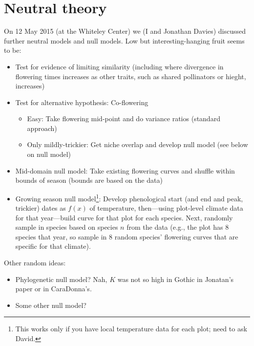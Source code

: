 \documentclass[11pt,a4paper]{article}
\begin{document}
\section{Neutral theory}
On 12 May 2015 (at the Whiteley Center) we (I and Jonathan Davies) discussed further neutral models and null models. Low but interesting-hanging fruit seems to be:
\begin{itemize}
\item Test for evidence of limiting similarity (including where divergence in flowering times increases as other traits, such as shared pollinators or hieght, increases)
\item Test for alternative hypothesis: Co-flowering
\begin{itemize}
\item Easy: Take flowering mid-point and do variance ratios (standard approach)
\item Only mildly-trickier: Get niche overlap and develop null model (see below on null model)
\end{itemize}
\item Mid-domain null model: Take existing flowering curves and shuffle within bounds of season (bounds are based on the data)
\item Growing season null model\footnote{This works only if you have local temperature data for each plot; need to ask David.}: Develop phenological start (and end and peak, trickier) dates as $f(x)$ of temperature, then---using plot-level climate data for that year---build curve for that plot for each species. Next, randomly sample in species based on species $n$ from the data (e.g., the plot has 8 species that year, so sample in 8 random species' flowering curves that are specific for that climate). 
\end{itemize}

Other random ideas:
\begin{itemize}
\item Phylogenetic null model? Nah, $K$ was not so high in Gothic in Jonatan's paper or in CaraDonna's. 
\item Some other null model?
\end{itemize}
\end{document}
